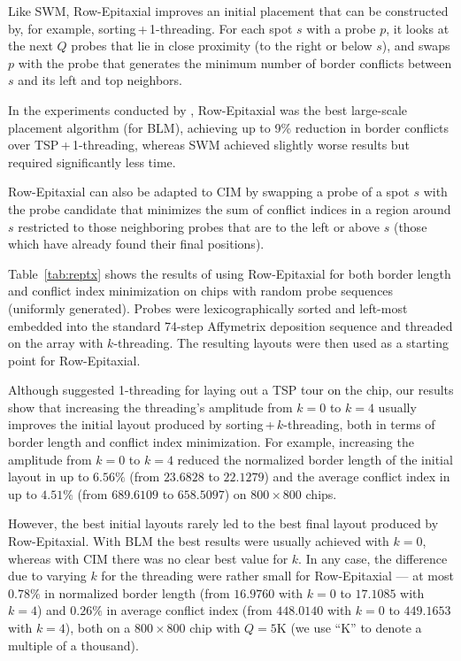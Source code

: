 Like SWM, Row-Epitaxial improves an initial placement that can be constructed
by, for example, sorting\,+\,1-threading. For each spot $s$ with a probe $p$,
it looks at the next $Q$ probes that lie in close proximity (to the right or
below $s$), and swaps $p$ with the probe that generates the minimum number of
border conflicts between $s$ and its left and top neighbors.

In the experiments conducted by \citet{Kahng2003}, Row-Epitaxial was the best
large-scale placement algorithm (for BLM), achieving up to 9\% reduction in
border conflicts over TSP\,+\,1-threading, whereas SWM achieved slightly
worse results but required significantly less time.

Row-Epitaxial can also be adapted to CIM by swapping a probe of a spot $s$ with
the probe candidate that minimizes the sum of conflict indices in a region
around $s$ restricted to those neighboring probes that are to the left or above
$s$ (those which have already found their final positions).

Table~\ref{tab:reptx} shows the results of using Row-Epitaxial for both border
length and conflict index minimization on chips with random probe sequences
(uniformly generated). Probes were lexicographically sorted and left-most
embedded into the standard 74-step Affymetrix deposition sequence and threaded
on the array with $k$-threading. The resulting layouts were then used as a
starting point for Row-Epitaxial.

Although \citet{Hannenhalli2002} suggested 1-threading for laying out a TSP tour
on the chip, our results show that increasing the threading's amplitude from
$k=0$ to $k=4$ usually improves the initial layout produced by
sorting\,+\,$k$-threading, both in terms of border length and conflict index
minimization. For example, increasing the amplitude from $k=0$ to $k=4$ reduced
the normalized border length of the initial layout in up to $6.56\%$ (from
$23.6828$ to $22.1279$) and the average conflict index in up to $4.51\%$ (from
$689.6109$ to $658.5097$) on $800\times 800$ chips.

However, the best initial layouts rarely led to the best final layout produced
by Row-Epitaxial. With BLM the best results were usually achieved with $k=0$,
whereas with CIM there was no clear best value for $k$. In any case, the
difference due to varying $k$ for the threading were rather small for
Row-Epitaxial --- at most $0.78\%$ in normalized border length (from $16.9760$
with $k=0$ to $17.1085$ with $k=4$) and $0.26\%$ in average conflict index (from
$448.0140$ with $k=0$ to $449.1653$ with $k=4$), both on a $800\times 800$ chip
with $Q=5$K (we use ``K'' to denote a multiple of a thousand).

